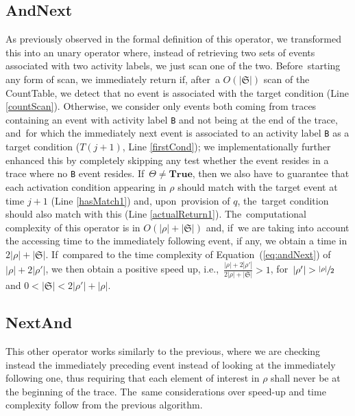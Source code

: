 \documentclass[information,article,accept,pdftex,oneauthor]{Definitions/mdpi}
\newcommand{\LOG}{\ensuremath{\mathfrak{S}}}
\begin{document}
\subsection{AndNext} 

As previously observed in the formal definition of this operator, we transformed this into an unary operator where, instead of retrieving two sets of events associated with two activity labels, we just scan one of the two. Before~starting any form of scan, we immediately return if, after~a $O(|\LOG|)$ scan of the CountTable, we detect that no event is associated with the target condition ({Line} \ref{countScan}). Otherwise, we consider only events both coming from traces containing an event with  activity label \texttt{B} and not being at the end of the trace, and~for which the immediately next event is associated to an activity label {\texttt{B}} %
 as a target condition ($T(j+1)$, {Line} \ref{firstCond}); we implementationally further enhanced this by completely skipping any test whether the event resides in a trace where no \texttt{B} event resides. If~$\Theta\neq\textbf{True}$, then we also have to guarantee that each activation condition appearing in $\rho$ should match with the target event at time $j+1$ ({Line} \ref{hasMatch1}) and, upon~provision of $q$, the~target condition should also match with this ({Line} \ref{actualReturn1}). The~computational complexity of this operator is in $O(|\rho|+|\LOG|)$ and, if~we are taking into account the accessing time to the immediately following event, if any, we obtain a time in $2|\rho|+|\LOG|$. If~compared to the time complexity of Equation~(\ref{eq:andNext}) of $|\rho|+2|\rho'|$, we then obtain a positive speed up, i.e.,~$\frac{|\rho|+2|\rho'|}{2|\rho|+|\LOG|}> 1$, for~$|\rho'|>\sfrac{|\rho|}{2}$ and $0<|\LOG|<2|\rho'|+|\rho|$.  

\subsection{NextAnd} 

This other operator works similarly to the previous, where we are checking instead the immediately preceding event instead of looking at the immediately following one, thus requiring that each element of interest in $\rho$ shall never be at the beginning of the trace. The~same considerations over speed-up and time complexity follow from the previous algorithm. %
\medskip
\end{document}
